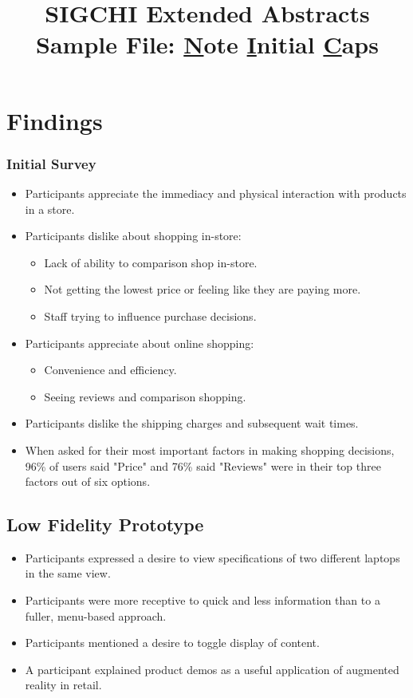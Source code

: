 \documentclass{sigchi-ext}
\begin{document}
\title{SIGCHI Extended Abstracts Sample File: \underline{N}ote
  \underline{I}nitial \underline{C}aps}

\section{Findings}

\subsubsection{Initial Survey}
\begin{itemize}
\item Participants appreciate the immediacy and physical interaction with products in a store.
\item Participants dislike about shopping in-store:
	\begin{itemize} \compresslist%
		\item Lack of ability to comparison shop in-store.
		\item Not getting the lowest price or feeling like they are paying more.
		\item Staff trying to influence purchase decisions.
	\end{itemize}
\item Participants appreciate about online shopping:
	\begin {itemize} \compresslist%
		\item Convenience and efficiency.
		\item Seeing reviews and comparison shopping.
	\end{itemize}
\item Participants dislike the shipping charges and subsequent wait times.
\item When asked for their most important factors in making shopping decisions, 96\% of users said "Price" and 76\% said "Reviews" were in their top three factors out of six options.
\end{itemize}

\subsection{Low Fidelity Prototype}
\begin{itemize}
	\item Participants expressed a desire to view specifications of two different laptops in the same view.
	\item Participants were more receptive to quick and less information than to a fuller, menu-based approach.
	\item Participants mentioned a desire to toggle display of content.
	\item A participant explained product demos as a useful application of augmented reality in retail.
\end{itemize}
\end{document}
